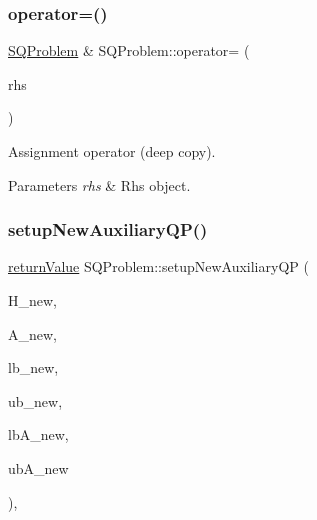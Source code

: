 \subsubsection{\texorpdfstring{operator=()}{operator=()}}
{\footnotesize\ttfamily \hyperlink{class_s_q_problem}{S\+Q\+Problem} \& S\+Q\+Problem\+::operator= (\begin{DoxyParamCaption}\item[{const \hyperlink{class_s_q_problem}{S\+Q\+Problem} \&}]{rhs }\end{DoxyParamCaption})\hspace{0.3cm}{\ttfamily [virtual]}}

Assignment operator (deep copy). 
\begin{DoxyParams}{Parameters}
{\em rhs} & Rhs object. \\
\hline
\end{DoxyParams}
\mbox{\label{class_s_q_problem_a5a7ba9f2bafb46f3621d830a88447934}} 
\subsubsection{\texorpdfstring{setup\+New\+Auxiliary\+Q\+P()}{setupNewAuxiliaryQP()}\hspace{0.1cm}{\footnotesize\ttfamily [1/2]}}
{\footnotesize\ttfamily \hyperlink{_message_handling_8hpp_a81d556f613bfbabd0b1f9488c0fa865e}{return\+Value} S\+Q\+Problem\+::setup\+New\+Auxiliary\+QP (\begin{DoxyParamCaption}\item[{\hyperlink{class_symmetric_matrix}{Symmetric\+Matrix} $\ast$}]{H\+\_\+new,  }\item[{\hyperlink{class_matrix}{Matrix} $\ast$}]{A\+\_\+new,  }\item[{const \hyperlink{qp_o_a_s_e_s__wrapper_8h_a0d00e2b3dfadee81331bbb39068570c4}{real\+\_\+t} $\ast$}]{lb\+\_\+new,  }\item[{const \hyperlink{qp_o_a_s_e_s__wrapper_8h_a0d00e2b3dfadee81331bbb39068570c4}{real\+\_\+t} $\ast$}]{ub\+\_\+new,  }\item[{const \hyperlink{qp_o_a_s_e_s__wrapper_8h_a0d00e2b3dfadee81331bbb39068570c4}{real\+\_\+t} $\ast$}]{lb\+A\+\_\+new,  }\item[{const \hyperlink{qp_o_a_s_e_s__wrapper_8h_a0d00e2b3dfadee81331bbb39068570c4}{real\+\_\+t} $\ast$}]{ub\+A\+\_\+new }\end{DoxyParamCaption})\hspace{0.3cm}{\ttfamily [protected]}, {\ttfamily [virtual]}}

